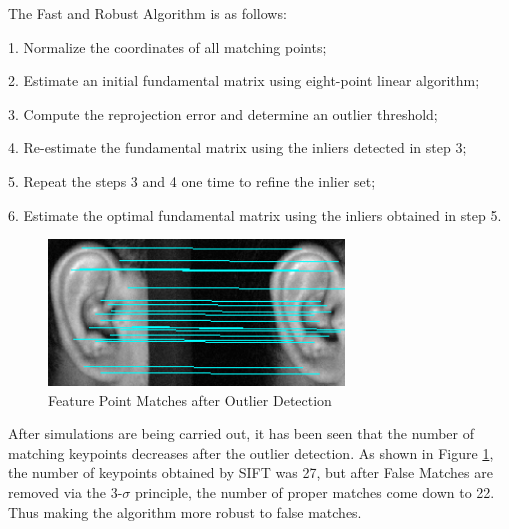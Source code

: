 The  Fast and Robust Algorithm is as follows:

1. Normalize the coordinates of all matching points; 

2. Estimate an initial fundamental matrix using eight-point linear algorithm; 

3. Compute the reprojection error and determine an outlier threshold; 

4. Re-estimate the fundamental matrix using the inliers detected in step 3; 

5. Repeat the steps 3 and 4 one time to refine the inlier set; 

6. Estimate the optimal fundamental matrix using the inliers obtained in step 5. 

\begin{figure}[b]
	\begin{center}
	\includegraphics[width=0.7\textwidth]{Figures/Figure22}
	\caption{Feature Point Matches after Outlier Detection}
	\label{fig:Figure22}
	\end{center}
\end{figure}

After simulations are being carried out, it has been seen that the number of matching keypoints decreases after the outlier detection. As shown in Figure \ref{fig:Figure22}, the number of keypoints obtained by SIFT was 27, but after False Matches are removed via the 3-$\sigma$ principle, the number of proper matches come down to 22. Thus making the algorithm more robust to false matches.


